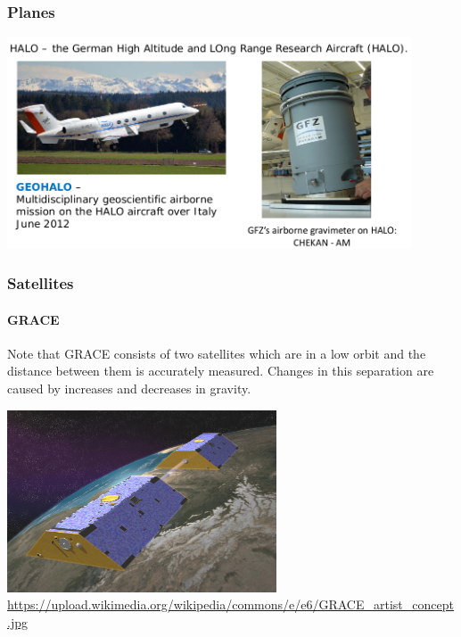 \subsubsection{Planes}

\begin{center}
\includegraphics[width=12cm]{images/gravity/halo}
\end{center}





\subsubsection{Satellites}

\paragraph{GRACE}

Note that GRACE consists of two satellites
which are in a low orbit and the distance between them
is accurately measured. Changes in this
separation are caused by increases and decreases
in gravity.

\begin{center}
\includegraphics[width=8cm]{images/gravity/GRACE_artist_concept}\\
{\captionfont \url{https://upload.wikimedia.org/wikipedia/commons/e/e6/GRACE_artist_concept.jpg}}
\end{center}


